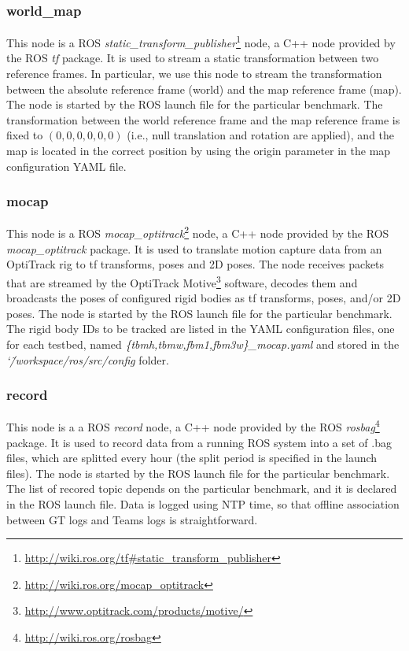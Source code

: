 \documentclass[a4paper]{article}
\newcommand{\srcdir}{\char`\~/workspace/ros/src/}
\begin{document}
\subsubsection{world\_map}
\label{sec:world_map}

This node is a ROS \emph{static\_transform\_publisher}\footnote{\url{http://wiki.ros.org/tf\#static\_transform\_publisher}} node, a C++ node provided by the ROS \emph{tf} package.
It is used to stream a static transformation between two reference frames.
In particular, we use this node to stream the transformation between the absolute reference frame (world) and the map reference frame (map).
The node is started by the ROS launch file for the particular benchmark.
The transformation between the world reference frame and the map reference frame is fixed to $(0, 0, 0, 0, 0, 0)$ (i.e., null translation and rotation are applied), and the map is located in the correct position by using the origin parameter in the map configuration YAML file.

\subsubsection{mocap}
\label{sec:mocap}

This node is a ROS \emph{mocap\_optitrack}\footnote{\url{http://wiki.ros.org/mocap\_optitrack}} node, a C++ node provided by the ROS \emph{mocap\_optitrack} package.
It is used to translate motion capture data from an OptiTrack rig to tf transforms, poses and 2D poses.
The node receives packets that are streamed by the OptiTrack Motive\footnote{\url{http://www.optitrack.com/products/motive/}} software, decodes them and broadcasts the poses of configured rigid bodies as tf transforms, poses, and/or 2D poses.
The node is started by the ROS launch file for the particular benchmark.
The rigid body IDs to be tracked are listed in the YAML configuration files, one for each testbed, named \emph{\{tbmh,tbmw,fbm1,fbm3w\}\_mocap.yaml} and stored in the \emph{\srcdir config} folder.

\subsubsection{record}
\label{sec:record}

This node is a a ROS \emph{record} node, a C++ node provided by the ROS \emph{rosbag}\footnote{\url{http://wiki.ros.org/rosbag}} package.
It is used to record data from a running ROS system into a set of .bag files, which are splitted every hour (the split period is specified in the launch files).
The node is started by the ROS launch file for the particular benchmark.
The list of recored topic depends on the particular benchmark, and it is declared in the ROS launch file.
Data is logged using NTP time, so that offline association between GT logs and Teams logs is straightforward.
\end{document}
